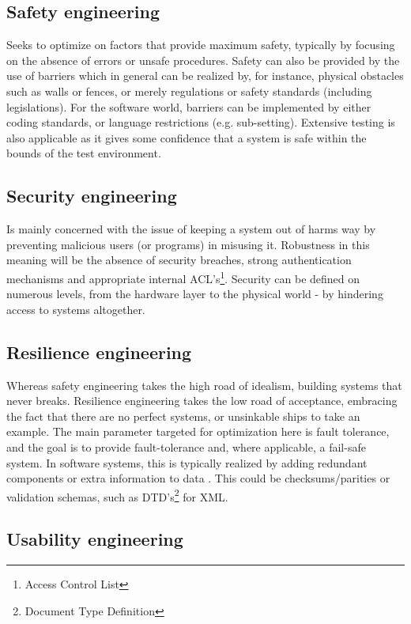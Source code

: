 \documentclass[10pt,a4paper]{article}
\begin{document}
\subsection{Safety engineering}

Seeks to optimize on factors that provide maximum safety, typically by focusing on the absence of errors or unsafe procedures. Safety can also be provided by the use of barriers which in general can be realized by, for instance, physical obstacles such as walls or fences, or merely regulations or safety standards (including legislations).
For the software world, barriers can be implemented by either coding standards, or language restrictions (e.g. sub-setting). Extensive testing is also applicable as it gives some confidence that a system is safe within the bounds of the test environment.

\subsection{Security engineering}

Is mainly concerned with the issue of keeping a system out of harms way by preventing malicious users (or programs) in misusing it.
Robustness in this meaning will be the absence of security breaches, strong authentication mechanisms and appropriate internal ACL’s\footnote{Access Control List}.
Security can be defined on numerous levels, from the hardware layer to the physical world - by hindering access to systems altogether.

\subsection{Resilience engineering}
Whereas safety engineering takes the high road of idealism, building systems that never breaks. Resilience engineering takes the low road of acceptance, embracing the fact that there are no perfect systems, or unsinkable ships to take an example.
The main parameter targeted for optimization here is fault tolerance, and the goal is to provide fault-tolerance and, where applicable, a fail-safe system.
In software systems, this is typically realized by adding redundant components or extra information to data\cite{KoKr07}
. This could be checksums/parities or validation schemas, such as DTD’s\footnote{Document Type Definition} for XML.

\subsection{Usability engineering}
\end{document}
